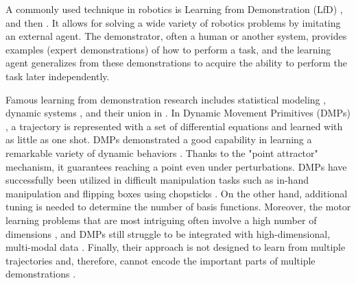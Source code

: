 A commonly used technique in robotics is Learning from Demonstration (LfD) \cite{ARGALL2009469} \cite{schaal1999imitation}, and then \cite{ravichandar2020recent}. It allows for solving a wide variety of robotics problems by imitating an external agent. The demonstrator, often a human or another system, provides examples (expert demonstrations) of how to perform a task, and the learning agent generalizes from these demonstrations to acquire the ability to perform the task later independently.

Famous learning from demonstration research includes statistical modeling \cite{calinon2016tutorial}, dynamic systems \cite{schaal2006dynamic}, and their union in \cite{ugur2020compliant}. In Dynamic Movement Primitives (DMPs) \cite{schaal2006dynamic} \cite{ijspeert2002learning}, a trajectory is represented with a set of differential equations and learned with as little as one shot. DMPs demonstrated a good capability in learning a remarkable variety of dynamic behaviors \cite{mulling2013learning}. Thanks to the "point attractor" mechanism, it guarantees reaching a point even under perturbations. DMPs have successfully been utilized in difficult manipulation tasks such as in-hand manipulation and flipping boxes using chopsticks \cite{pastor2009learning}. On the other hand, additional tuning is needed to determine the number of basis functions. Moreover, the motor learning problems that are most intriguing often involve a high number of dimensions \cite{kober2008policy}, and DMPs still struggle to be integrated with high-dimensional, multi-modal data \cite{saveriano2021dynamic}. Finally, their approach is not designed to learn from multiple trajectories and, therefore, cannot encode the important parts of multiple demonstrations \cite{Ugur-RSS-19}. 

